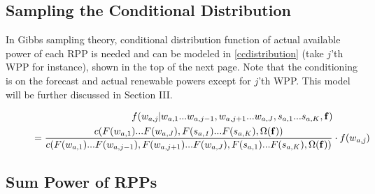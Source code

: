\subsection {Sampling the Conditional Distribution}
In Gibbs sampling theory, conditional distribution function of actual available power of each RPP is needed and can be modeled in \eqref{ccdistribution} (take $j$'th WPP for instance), shown in the top of the next page. Note that the conditioning is on the forecast and actual renewable powers except for $j$'th WPP. This model will be further discussed in Section III.
\setcounter{TempEqCnt}{\value{equation}}
\setcounter{equation}{4}
\begin{figure*}[t]
	\hrulefill
	\begin{equation} \label{ccdistribution}
	\begin{aligned}
	f(w_{a,{\it j} }|w_{a,{1} }. . .w_{a,j-1},w_{a,j+1}...w_{a,J},s_{a,{1}}. . .s_{a,K},\mathbf{f}) \\
	=\frac{c(F(w_{a,{1}})...F(w_{a,J}),F(s_{a,{\it 1}})...F(s_{a,K}),\Omega(\mathbf{f}))}{c(F(w_{a,{1}})...F(w_{a,j-1}),F(w_{a,j+1})...F(w_{a,J}),F(s_{a,{1}})...F(s_{a,K}),\Omega(\mathbf{f}))} & \cdot f(w_{a,{\it j}})
	\end{aligned}
	\end{equation}
\end{figure*}
\setcounter{equation}{\value{TempEqCnt}}




\subsection {Sum Power of RPPs}

